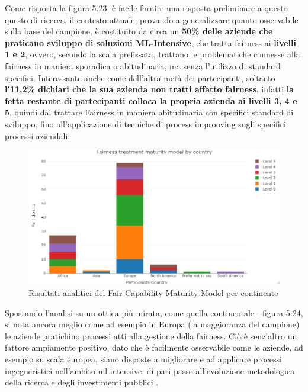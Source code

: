     Come risporta la figura 5.23, è facile fornire una risposta preliminare a questo questo di ricerca, il contesto attuale, provando a generalizzare quanto osservabile sulla base del campione, è costituito da circa un \textbf{50\% delle aziende che praticano sviluppo di soluzioni ML-Intensive}, che tratta fairness ai \textbf{livelli 1 e 2}, ovvero, secondo la scala prefissata, trattano le problematiche connesse alla fairness in maniera sporadica o abitudinaria, ma senza l'utilizzo di standard specifici. Interessante anche come dell'altra metà dei partecipanti, soltanto \textbf{l'11,2\% dichiari che la sua azienda non tratti affatto fairness}, infatti \textbf{la fetta restante di partecipanti colloca la propria azienda ai livelli 3, 4 e 5}, quindi dal trattare Fairness in maniera abitudinaria con specifici standard di sviluppo, fino all'applicazione di tecniche di process improoving sugli specifici processi aziendali. 
    
     \begin{figure}[h!]
        \centering
        \includegraphics[width=1\textwidth]{figure/Analisi/RQ5/Fairness treatment maturity model by country.png}
        \caption{Risultati analitici del Fair Capability Maturity Model per continente}
    \end{figure}
    
    Spostando l'analisi su un ottica più mirata, come quella continentale - figura 5.24, si nota ancora meglio come ad esempio in Europa (la maggioranza del campione) le aziende pratichino processi atti alla gestione della fairness. Ciò è senz'altro un fattore ampiamente positivo, dato che è facilmente osservabile come le aziende, ad esempio su scala europea, siano disposte a migliorare e ad applicare processi ingegneristici nell'ambito ml intensive, di pari passo all'evoluzione metodologica della ricerca e degli investimenti pubblici \cite{ritson201317}.
    
